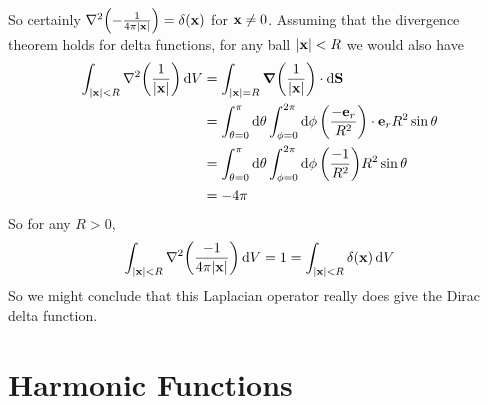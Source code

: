 \documentclass{article}
\begin{document}
So certainly $\laplacian(-\frac{1}{4\pi\abs{\vb x}}) = \delta(\vb x)$ for $\vb x \neq 0$. Assuming that the divergence theorem holds for delta functions, for any ball $\abs{\vb x} < R$ we would also have
\begin{align*}
	\int_{\abs{\vb x} < R} \laplacian(\frac{1}{\abs{\vb x}}) \dd{V} & = \int_{\abs{\vb x} = R} \grad(\frac{1}{\abs{\vb x}}) \cdot \dd{\vb S}                                                          \\
	                                                                & = \int_{\theta = 0}^{\pi} \dd{\theta} \int_{\phi = 0}^{2 \pi} \dd{\phi} \qty(\frac{-\vb e_r}{R^2}) \cdot \vb e_r R^2 \sin\theta \\
	                                                                & = \int_{\theta = 0}^{\pi} \dd{\theta} \int_{\phi = 0}^{2 \pi} \dd{\phi} \qty(\frac{-1}{R^2}) R^2 \sin\theta                     \\
	                                                                & = -4\pi
\end{align*}
So for any $R > 0$,
\[ \int_{\abs{\vb x} < R} \laplacian(\frac{-1}{4\pi\abs{\vb x}}) \dd{V} = 1 = \int_{\abs{\vb x} < R} \delta(\vb x) \dd{V} \]
So we might conclude that this Laplacian operator really does give the Dirac delta function.

\section{Harmonic Functions}
\end{document}
